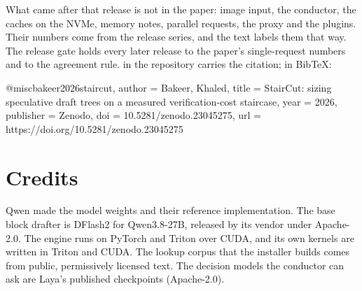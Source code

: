 What came after that release is not in the paper: image input, the conductor, the caches on the NVMe, memory notes, parallel requests, the proxy and the plugins. Their numbers come from the release series, and the text labels them that way. The release gate holds every later release to the paper's single-request numbers and to the agreement rule.  in the repository carries the citation; in BibTeX:

\begin{plain}
@misc{bakeer2026staircut,
  author    = {Bakeer, Khaled},
  title     = {StairCut: sizing speculative draft trees on a measured
               verification-cost staircase},
  year      = {2026},
  publisher = {Zenodo},
  doi       = {10.5281/zenodo.23045275},
  url       = {https://doi.org/10.5281/zenodo.23045275}
}
\end{plain}

\section{Credits}

Qwen made the model weights and their reference implementation. The base block drafter is DFlash2 for Qwen3.8-27B, released by its vendor under Apache-2.0. The engine runs on PyTorch and Triton over CUDA, and its own kernels are written in Triton and CUDA. The lookup corpus that the installer builds comes from public, permissively licensed text. The decision models the conductor can ask are Laya's published checkpoints (Apache-2.0).
